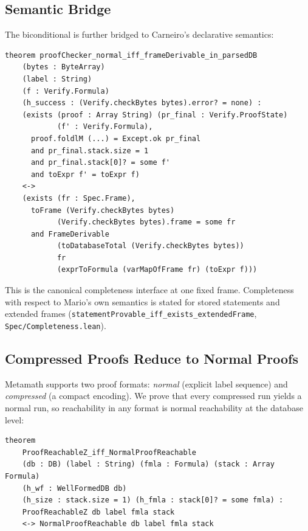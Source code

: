 \documentclass[11pt]{article}
\newcommand{\lean}[1]{\lstinline[language=Lean4]{#1}}
\newcommand{\file}[1]{\texttt{#1}}
\begin{document}
\subsection{Semantic Bridge}

The biconditional is further bridged to Carneiro's declarative semantics:

\begin{lstlisting}[caption={Semantic bridge (\file{ParserEquivalence.lean}).},label=lst:semantic-bridge]
theorem proofChecker_normal_iff_frameDerivable_in_parsedDB
    (bytes : ByteArray)
    (label : String)
    (f : Verify.Formula)
    (h_success : (Verify.checkBytes bytes).error? = none) :
    (exists (proof : Array String) (pr_final : Verify.ProofState)
            (f' : Verify.Formula),
      proof.foldlM (...) = Except.ok pr_final
      and pr_final.stack.size = 1
      and pr_final.stack[0]? = some f'
      and toExpr f' = toExpr f)
    <->
    (exists (fr : Spec.Frame),
      toFrame (Verify.checkBytes bytes)
            (Verify.checkBytes bytes).frame = some fr
      and FrameDerivable
            (toDatabaseTotal (Verify.checkBytes bytes))
            fr
            (exprToFormula (varMapOfFrame fr) (toExpr f)))
\end{lstlisting}

This is the canonical completeness interface at one fixed frame.
Completeness with respect to Mario's own semantics is stated for
stored statements and extended frames
(\lean{statementProvable_iff_exists_extendedFrame},
\file{Spec/Completeness.lean}).

\subsection{Compressed Proofs Reduce to Normal Proofs}

Metamath supports two proof formats: \emph{normal} (explicit label
sequence) and \emph{compressed} (a compact encoding).  We prove that every
compressed run yields a normal run, so reachability in any format is normal
reachability at the database level:

\begin{lstlisting}[caption={Compressed-to-normal reduction (\file{ParserAnyFormatEquivalence.lean}).},label=lst:mode-equiv]
theorem
    ProofReachableZ_iff_NormalProofReachable
    (db : DB) (label : String) (fmla : Formula) (stack : Array Formula)
    (h_wf : WellFormedDB db)
    (h_size : stack.size = 1) (h_fmla : stack[0]? = some fmla) :
    ProofReachableZ db label fmla stack
    <-> NormalProofReachable db label fmla stack
\end{lstlisting}
\end{document}
